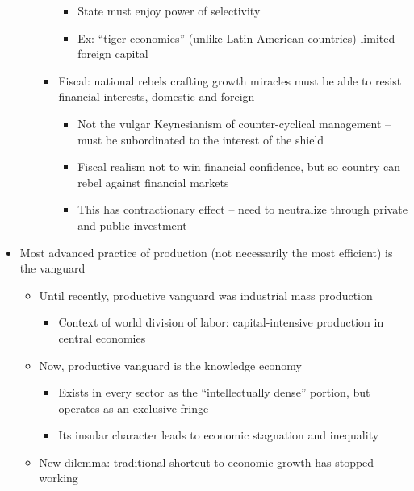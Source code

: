 \begin{itemize}
\begin{itemize}
\begin{itemize}
      \begin{itemize}
      \tightlist
      \item
        State must enjoy power of selectivity
      \item
        Ex: ``tiger economies'' (unlike Latin American countries)
        limited foreign capital
      \end{itemize}
    \item
      Fiscal: national rebels crafting growth miracles must be able to
      resist financial interests, domestic and foreign

      \begin{itemize}
      \tightlist
      \item
        Not the vulgar Keynesianism of counter-cyclical management --
        must be subordinated to the interest of the shield
      \item
        Fiscal realism not to win financial confidence, but so country
        can rebel against financial markets
      \item
        This has contractionary effect -- need to neutralize through
        private and public investment
      \end{itemize}
    \end{itemize}
  \end{itemize}
\item
  Most advanced practice of production (not necessarily the most
  efficient) is the vanguard

  \begin{itemize}
  \tightlist
  \item
    Until recently, productive vanguard was industrial mass production

    \begin{itemize}
    \tightlist
    \item
      Context of world division of labor: capital-intensive production
      in central economies
    \end{itemize}
  \item
    Now, productive vanguard is the knowledge economy

    \begin{itemize}
    \tightlist
    \item
      Exists in every sector as the ``intellectually dense'' portion,
      but operates as an exclusive fringe
    \item
      Its insular character leads to economic stagnation and inequality
    \end{itemize}
  \item
    New dilemma: traditional shortcut to economic growth has stopped
    working


\end{itemize}
\end{itemize}

